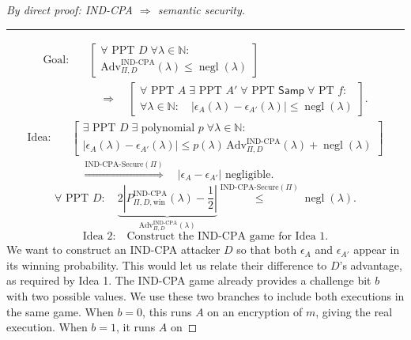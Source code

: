\documentclass[12pt,a4paper]{article}
\theoremstyle{definition}
\theoremstyle{remark}
\DeclareMathOperator{\negl}{negl}
\begin{document}
\begin{proof}[By direct proof: IND-CPA $\Longrightarrow$ semantic security]
\leavevmode\par\smallskip\hrule\medskip
\[
\begin{aligned}
\text{Goal:}\quad
&\left[\begin{gathered}
\forall\text{ PPT }D\;
\forall\lambda\in\mathbb{N}:\\
\mathrm{Adv}^{\mathrm{IND\text{-}CPA}}_{\Pi,D}(\lambda)\leq\negl(\lambda)
\end{gathered}\right]\\
&\quad\Longrightarrow\quad
\left[\begin{gathered}
\forall\text{ PPT }A\;\exists\text{ PPT }A'\;
\forall\text{ PPT }\mathsf{Samp}\;\forall\text{ PT }f:\\
\forall\lambda\in\mathbb{N}:\quad
|\epsilon_A(\lambda)-\epsilon_{A'}(\lambda)|\leq\negl(\lambda)
\end{gathered}\right].
\end{aligned}
\]
\[
\begin{aligned}
\text{Idea:}\quad
&\left[\begin{gathered}
\exists\text{ PPT }D\;\exists\text{ polynomial }p\;
\forall\lambda\in\mathbb{N}:\\
|\epsilon_A(\lambda)-\epsilon_{A'}(\lambda)|
\leq p(\lambda)\,\mathrm{Adv}^{\mathrm{IND\text{-}CPA}}_{\Pi,D}(\lambda)
+\negl(\lambda)
\end{gathered}\right]\\
&\quad\overset{\mathrm{IND\text{-}CPA\text{-}Secure}(\Pi)}{\Longrightarrow}\quad
|\epsilon_A-\epsilon_{A'}|\text{ negligible}.
\end{aligned}
\]
\renewcommand{\qedsymbol}{}
\[
\forall\text{ PPT }D:\quad
\underbrace{2\left|P_{\Pi,D,\mathrm{win}}^{\mathrm{IND\text{-}CPA}}(\lambda)-\frac12\right|}_{\mathrm{Adv}_{\Pi,D}^{\mathrm{IND\text{-}CPA}}(\lambda)}
\overset{\mathrm{IND\text{-}CPA\text{-}Secure}(\Pi)}{\leq}\negl(\lambda).
\tag{2}\label{eq:indcpa-negligible-bound}
\]
\[
\text{Idea 2:}\quad\text{Construct the IND-CPA game for Idea 1.}
\]
We want to construct an IND-CPA attacker $D$ so that both
$\epsilon_A$ and $\epsilon_{A'}$ appear in its winning probability.
This would let us relate their difference to $D$'s advantage, as required
by Idea 1. The IND-CPA game already provides a challenge bit $b$ with
two possible values. We use these two branches to include both executions
in the same game. When $b=0$, this runs $A$ on an
encryption of $m$, giving the real execution. When $b=1$, it runs $A$ on

\end{proof}
\end{document}
